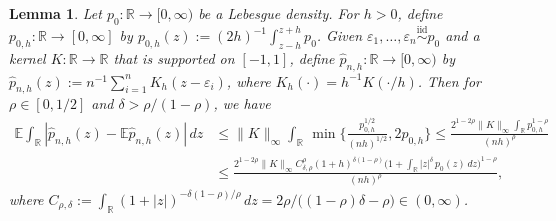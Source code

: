 \documentclass[a4paper]{article}
\newcommand{\R}{\mathbb{R}}
\newcommand{\E}{\mathbb{E}}
\newcommand{\norm}[1]{\|{#1}\|}
\newcommand{\iid}{\overset{\mathrm{iid}}{\sim}}
\newtheorem{lemma}[theorem]{Lemma}
\theoremstyle{definition}
\begin{document}
\begin{lemma}
\label{lem:L1-kde}
Let $p_0 \colon \R \to [0,\infty)$ be a Lebesgue density. For $h > 0$, define $p_{0,h} \colon \R \to [0,\infty]$ by $p_{0,h}(z) := (2h)^{-1}\int_{z - h}^{z + h} p_0$. Given $\varepsilon_1,\dotsc,\varepsilon_n \iid p_0$ and a kernel $K \colon \R \to \R$ that is supported on $[-1,1]$, define $\hat{p}_{n,h} \colon \R \to [0,\infty)$ by $\hat{p}_{n,h}(z) := n^{-1}\sum_{i=1}^n K_h(z - \varepsilon_i)$, where $K_h(\cdot) = h^{-1}K(\cdot/h)$. Then for $\rho \in [0,1/2]$ and $\delta > \rho/(1 - \rho)$, we have
\begin{align*}
\E\int_\R |\hat{p}_{n,h}(z) - \E\hat{p}_{n,h}(z)|\,dz &\leq \norm{K}_\infty \int_\R\,\min\biggl\{\frac{p_{0,h}^{1/2}}{(nh)^{1/2}}, 2p_{0,h}\biggr\} \leq \frac{2^{1 - 2\rho} \norm{K}_\infty \int_\R p_{0,h}^{1 - \rho}}{(nh)^\rho} \\ 
&\leq \frac{2^{1 - 2\rho} \norm{K}_\infty C_{\delta,\rho}^\rho(1 + h)^{\delta(1 - \rho)}\bigl(1 + \int_\R |z|^\delta\,p_0(z)\,dz\bigr)^{1 - \rho}}{(nh)^\rho},
\end{align*}
where $C_{\rho,\delta} := \int_\R (1 + |z|)^{-\delta(1 - \rho)/\rho}\,dz = 2\rho/\bigl((1 - \rho)\delta - \rho\bigr) \in (0,\infty)$.
\end{lemma}
\end{document}
